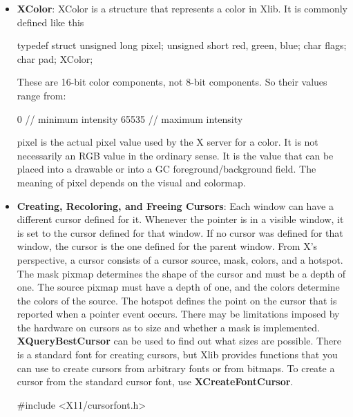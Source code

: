 \documentclass{report}
\begin{document}
\begin{itemize}
            \bigbreak \noindent 
            For normal text drawing, a font contains glyphs for characters. For cursor creation, Xlib can also use those glyph bitmaps as cursor images.
            \bigbreak \noindent 
            \begin{cppcode}
            Font font = XLoadFont(display, "cursor");
            \end{cppcode}
            \bigbreak \noindent 
            This loads the standard X cursor font and returns a Font ID. Then XCreateGlyphCursor can use glyphs from that font as the cursor’s source and mask.
        \item \textbf{XColor}: XColor is a structure that represents a color in Xlib. It is commonly defined like this
            \bigbreak \noindent 
            \begin{cppcode}
                typedef struct {
                    unsigned long pixel;
                    unsigned short red, green, blue;
                    char flags; 
                    char pad;
                } XColor;
            \end{cppcode}
            \bigbreak \noindent 
            These are 16-bit color components, not 8-bit components. So their values range from:
            \bigbreak \noindent 
            \begin{cppcode}
                0      // minimum intensity
                65535  // maximum intensity
            \end{cppcode}
            \bigbreak \noindent 
            pixel is the actual pixel value used by the X server for a color.
            \bigbreak \noindent 
            It is not necessarily an RGB value in the ordinary sense. It is the value that can be placed into a drawable or into a GC foreground/background field.
            \bigbreak \noindent 
            The meaning of pixel depends on the visual and colormap.
        \item \textbf{Creating, Recoloring, and Freeing Cursors}:
            Each window can have a different cursor defined for it. Whenever the pointer is in a visible window, it is set to the cursor defined for that window. If no cursor was defined for that window, the cursor is the one defined for the parent window.
            \bigbreak \noindent
            From X's perspective, a cursor consists of a cursor source, mask, colors, and a hotspot. The mask pixmap determines the shape of the cursor and must be a depth of one. The source pixmap must have a depth of one, and the colors determine the colors of the source. The hotspot defines the point on the cursor that is reported when a pointer event occurs. There may be limitations imposed by the hardware on cursors as to size and whether a mask is implemented. \textbf{XQueryBestCursor} can be used to find out what sizes are possible. There is a standard font for creating cursors, but Xlib provides functions that you can use to create cursors from arbitrary fonts or from bitmaps.
            \bigbreak \noindent
            To create a cursor from the standard cursor font, use \textbf{XCreateFontCursor}.
            \bigbreak \noindent
            \begin{cppcode}
                #include <X11/cursorfont.h>


\end{cppcode}
\end{itemize}
\end{document}
